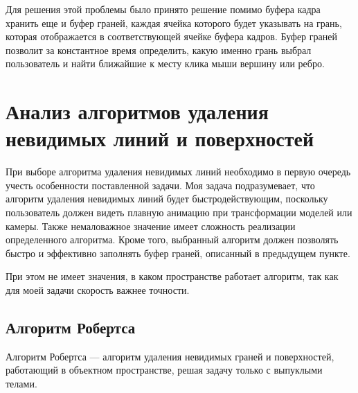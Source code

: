 Для решения этой проблемы было принято решение помимо буфера кадра хранить еще и буфер граней, каждая ячейка которого будет указывать на грань, которая отображается в соответствующей ячейке буфера кадров. Буфер граней позволит за константное время определить, какую именно грань выбрал пользователь и найти ближайшие к месту клика мыши вершину или ребро.

\section{Анализ алгоритмов удаления невидимых линий и поверхностей}

При выборе алгоритма удаления невидимых линий необходимо в первую очередь учесть особенности поставленной задачи. Моя задача подразумевает, что алгоритм удаления невидимых линий будет быстродействующим, поскольку пользователь должен видеть плавную анимацию при трансформации моделей или камеры. Также немаловажное значение имеет сложность реализации определенного алгоритма. Кроме того, выбранный алгоритм должен позволять быстро и эффективно заполнять буфер граней, описанный в предыдущем пункте.

При этом не имеет значения, в каком пространстве работает алгоритм, так как для моей задачи скорость важнее точности.

\subsection{Алгоритм Робертса}

Алгоритм Робертса \cite{rogers_alg} --- алгоритм удаления невидимых граней и поверхностей, работающий в объектном пространстве, решая задачу только с выпуклыми телами.

